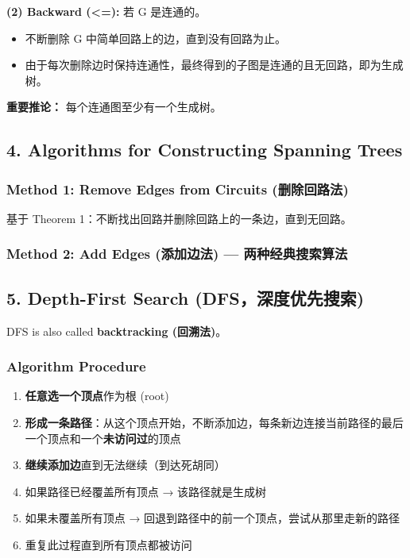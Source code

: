 \documentclass[10pt,a4paper,openany]{ctexbook}
\theoremstyle{definition}
\theoremstyle{remark}
\renewenvironment{quote}
  {\list{}{\leftmargin=1em\rightmargin=0pt\topsep=0.5pt\partopsep=0pt}\item[]}
  {\endlist}
\begin{document}
\textbf{(2) Backward (<=):} 若 G 是连通的。
\begin{itemize}
\item 不断删除 G 中简单回路上的边，直到没有回路为止。
\item 由于每次删除边时保持连通性，最终得到的子图是连通的且无回路，即为生成树。

\end{itemize}

\begin{quote}
\textbf{重要推论：} 每个连通图至少有一个生成树。

\end{quote}
\vspace{-2pt}

\subsection{4. Algorithms for Constructing Spanning Trees}

\subsubsection{Method 1: Remove Edges from Circuits (删除回路法)}

基于 Theorem 1：不断找出回路并删除回路上的一条边，直到无回路。
\subsubsection{Method 2: Add Edges (添加边法) — 两种经典搜索算法}

\vspace{-2pt}

\subsection{5. Depth-First Search (DFS，深度优先搜索)}

DFS is also called \textbf{backtracking (回溯法)}。
\subsubsection{Algorithm Procedure}

\begin{enumerate}
\item \textbf{任意选一个顶点}作为根 (root)
\item \textbf{形成一条路径}：从这个顶点开始，不断添加边，每条新边连接当前路径的最后一个顶点和一个\textbf{未访问过}的顶点
\item \textbf{继续添加边}直到无法继续（到达死胡同）
\item 如果路径已经覆盖所有顶点 → 该路径就是生成树
\item 如果未覆盖所有顶点 → 回退到路径中的前一个顶点，尝试从那里走新的路径
\item 重复此过程直到所有顶点都被访问

\end{enumerate}
\end{document}

